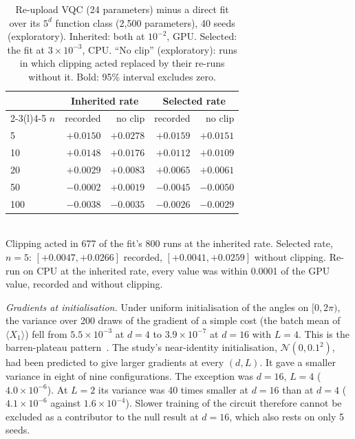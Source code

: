 \documentclass{ieeeaccess}
\newcommand{\vqc}{VQC}
\begin{document}
\begin{table}[t]
\caption{Re-upload \vqc{} (24 parameters) minus a direct fit over its $5^d$ function class (2,500 parameters), 40 seeds (exploratory). Inherited: both at $10^{-2}$, GPU. Selected: the fit at $3\times10^{-3}$, CPU. ``No clip'' (exploratory): runs in which clipping acted replaced by their re-runs without it. Bold: 95\% interval excludes zero.}
\label{tab:reupfc}
\centering
\setlength{\tabcolsep}{4pt}
\footnotesize
\begin{tabular}{@{}lrrrr@{}}
\toprule
 & \multicolumn{2}{c}{Inherited rate} & \multicolumn{2}{c}{Selected rate}\\
\cmidrule(lr){2-3}\cmidrule(l){4-5}
$n$ & recorded & no clip & recorded & no clip\\
\midrule
5 & $\mathbf{+0.0150}$ & $\mathbf{+0.0278}$ & $\mathbf{+0.0159}$ & $\mathbf{+0.0151}$\\
10 & $\mathbf{+0.0148}$ & $\mathbf{+0.0176}$ & $\mathbf{+0.0112}$ & $\mathbf{+0.0109}$\\
20 & $+0.0029$ & $\mathbf{+0.0083}$ & $\mathbf{+0.0065}$ & $\mathbf{+0.0061}$\\
50 & $-0.0002$ & $+0.0019$ & $-0.0045$ & $\mathbf{-0.0050}$\\
100 & $\mathbf{-0.0038}$ & $\mathbf{-0.0035}$ & $-0.0026$ & $-0.0029$\\
\bottomrule
\end{tabular}
\\[2pt]{\scriptsize Clipping acted in 677 of the fit's 800 runs at the inherited rate. Selected rate, $n=5$: $[+0.0047,+0.0266]$ recorded, $[+0.0041,+0.0259]$ without clipping. Re-run on CPU at the inherited rate, every value was within 0.0001 of the GPU value, recorded and without clipping.}
\end{table}

\emph{Gradients at initialisation.} Under uniform initialisation of the angles on $[0,2\pi)$, the variance over 200 draws of the gradient of a simple cost (the batch mean of $\langle X_1\rangle$) fell from $5.5\times10^{-3}$ at $d=4$ to $3.9\times10^{-7}$ at $d=16$ with $L=4$. This is the barren-plateau pattern~\cite{mcclean2018}. The study's near-identity initialisation, $\mathcal{N}(0,0.1^2)$, had been predicted to give larger gradients at every $(d,L)$. It gave a smaller variance in eight of nine configurations. The exception was $d=16$, $L=4$ ($4.0\times10^{-6}$). At $L=2$ its variance was 40 times smaller at $d=16$ than at $d=4$ ($4.1\times10^{-6}$ against $1.6\times10^{-4}$). Slower training of the circuit therefore cannot be excluded as a contributor to the null result at $d=16$, which also rests on only 5 seeds.
\end{document}
